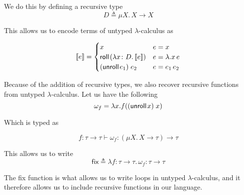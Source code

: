 \documentclass{lecturenotes}
\newcommand{\tabs}[3]{\ensuremath{\lambda #1 \colon #2.\,#3}}
\newcommand{\app}[2]{\ensuremath{#1\;#2}}
\newcommand{\rectype}[2]{\ensuremath{\mu #1.\,#2}}
\newcommand{\roll}[1]{\textsf{roll}\mkern2mu#1}
\newcommand{\unroll}[1]{\textsf{unroll}\mkern2mu#1}
\begin{document}
We do this by defining a recursive type
\[
  D \triangleq \rectype{X}{X \to X}
\]

This allows us to encode terms of untyped $\lambda$-calculus as

\[
  \llbracket e \rrbracket = \begin{cases}
    x & e = x\\
    \roll{(\tabs{x}{D}{\llbracket e \rrbracket})} & e = \lambda. x\, e\\
    \app{(\unroll{e_1})}{e_2} & e = e_1\, e_2
  \end{cases}
\]

Because of the addition of recursive types, we also recover recursive functions from untyped $\lambda$-calculus.
Let us have the following
\[
  \omega_f = \lambda x. f(\app{(\unroll{x})} {x})
\]

Which is typed as

\[
  f : \tau \to \tau \vdash \omega_f : (\rectype{X}{X \to \tau}) \to \tau
\]

This allows us to write
\[
  \textsf{fix} \triangleq \tabs{f}{\tau \to \tau}{\omega_f}: \tau \to \tau
\]

The \textsf{fix} function is what allows us to write loops in untyped $\lambda$-calculus, and it therefore allows us to include recursive functions in our language.
\end{document}
